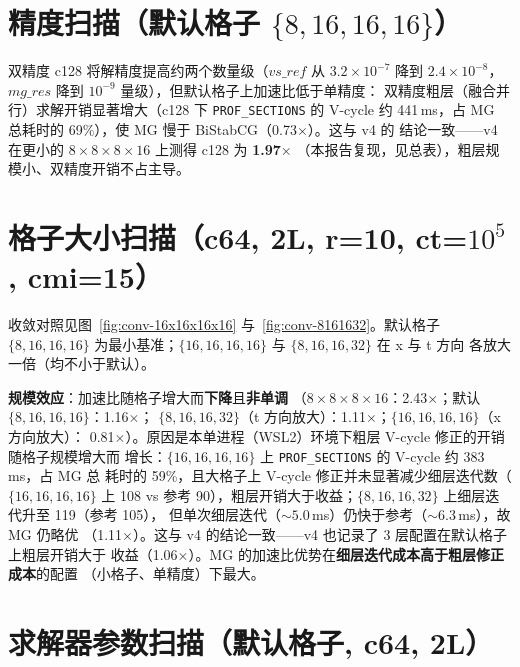 \documentclass[11pt,a4paper]{article}
\begin{document}
\section{精度扫描（默认格子 $\{8,16,16,16\}$）}
\label{sec:prec}



双精度 c128 将解精度提高约两个数量级（$vs\_ref$ 从 $3.2\times10^{-7}$ 降到
$2.4\times10^{-8}$，$mg\_res$ 降到 $10^{-9}$ 量级），但默认格子上加速比低于单精度：
双精度粗层（融合并行）求解开销显著增大（c128 下 \texttt{PROF\_SECTIONS} 的 V-cycle
约 441\,ms，占 MG 总耗时的 69\%），使 MG 慢于 BiStabCG（0.73$\times$）。这与 v4 的
结论一致——v4 在更小的 $8\times8\times8\times16$ 上测得 c128 为 \textbf{1.97$\times$}
（本报告复现，见总表），粗层规模小、双精度开销不占主导。

\section{格子大小扫描（c64, 2L, r=10, ct=$10^5$, cmi=15）}
\label{sec:lattice}



收敛对照见图~\ref{fig:conv-16x16x16x16} 与~\ref{fig:conv-8161632}。默认格子
$\{8,16,16,16\}$ 为最小基准；$\{16,16,16,16\}$ 与 $\{8,16,16,32\}$ 在 x 与 t 方向
各放大一倍（均不小于默认）。

\textbf{规模效应}：加速比随格子增大而\textbf{下降}且\textbf{非单调}
（$8\times8\times8\times16$：2.43$\times$；默认 $\{8,16,16,16\}$：1.16$\times$；
$\{8,16,16,32\}$（t 方向放大）：1.11$\times$；$\{16,16,16,16\}$（x 方向放大）：
0.81$\times$）。原因是本单进程（WSL2）环境下粗层 V-cycle 修正的开销随格子规模增大而
增长：$\{16,16,16,16\}$ 上 \texttt{PROF\_SECTIONS} 的 V-cycle 约 383\,ms，占 MG 总
耗时的 59\%，且大格子上 V-cycle 修正并未显著减少细层迭代数（$\{16,16,16,16\}$ 上
108 vs 参考 90），粗层开销大于收益；$\{8,16,16,32\}$ 上细层迭代升至 119（参考 105），
但单次细层迭代（$\sim5.0$\,ms）仍快于参考（$\sim6.3$\,ms），故 MG 仍略优
（1.11$\times$）。这与 v4 的结论一致——v4 也记录了 3 层配置在默认格子上粗层开销大于
收益（1.06$\times$）。MG 的加速比优势在\textbf{细层迭代成本高于粗层修正成本}的配置
（小格子、单精度）下最大。

\section{求解器参数扫描（默认格子, c64, 2L）}
\label{sec:params}


\end{document}
